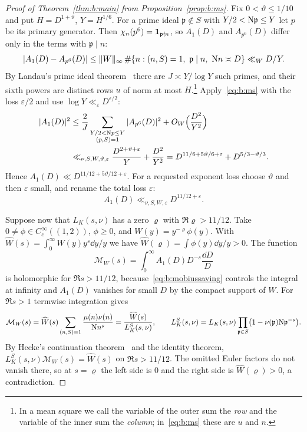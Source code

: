\begin{proof}[Proof of Theorem~\ref{thm:b:main} from Proposition~\ref{prop:b:ms}]
Fix $0<\vartheta\le1/10$ and put $H=D^{1+\vartheta}$, $Y=H^{1/6}$. For a prime ideal $\mathfrak p\notin S$ with $Y/2<\mathrm{N}\mathfrak p\le Y$ let $p$ be its primary generator. Then $\chi_n(p^6)=\mathbf{1}_{\mathfrak p\nmid n}$, so $A_1(D)$ and $A_{p^6}(D)$ differ only in the terms with $\mathfrak p\mid n$:
\[
  |A_1(D)-A_{p^6}(D)|\le\|W\|_\infty\,\#\{n:(n,S)=1,\ \mathfrak p\mid n,\ \NK n\asymp D\}\ll_WD/Y.
\]
By Landau's prime ideal theorem~\cite{Lan03} there are $J\asymp Y/\log Y$ such primes, and their sixth powers are distinct rows $u$ of norm at most $H$.\footnote{In a mean square we call the variable of the outer sum the \emph{row} and the variable of the inner sum the \emph{column}; in~\eqref{eq:b:ms} these are $u$ and $n$.} Apply~\eqref{eq:b:ms} with the loss $\varepsilon/2$ and use $\log Y\ll_\varepsilon D^{\varepsilon/2}$:
\begin{equation}\label{eq:b:primeextract}
\begin{aligned}
  |A_1(D)|^2&\le\frac2J\sum_{\substack{Y/2<\mathrm{N} p\le Y\\(p,S)=1}}|A_{p^6}(D)|^2+O_W\Bigl(\frac{D^2}{Y^2}\Bigr)\\
  &\ll_{\nu,S,W,\vartheta,\varepsilon}\frac{D^{2+\vartheta+\varepsilon}}Y+\frac{D^2}{Y^2}
  =D^{11/6+5\vartheta/6+\varepsilon}+D^{5/3-\vartheta/3}.
\end{aligned}
\end{equation}
Hence $A_1(D)\ll D^{11/12+5\vartheta/12+\varepsilon}$. For a requested exponent loss choose $\vartheta$ and then $\varepsilon$ small, and rename the total loss $\varepsilon$:
\begin{equation}\label{eq:b:mobiussaving}
  A_1(D)\ll_{\nu,S,W,\varepsilon}D^{11/12+\varepsilon}.
\end{equation}

Suppose now that $L_K(s,\nu)$ has a zero $\varrho$ with $\Re\varrho>11/12$. Take $0\ne\phi\in C_c^\infty((1,2))$, $\phi\ge0$, and $W(y)=y^{-\varrho}\phi(y)$. With $\widehat W(s)=\int_0^\infty W(y)y^s\dd y/y$ we have $\widehat W(\varrho)=\int\phi(y)\dd y/y>0$. The function
\[
  \mathcal M_W(s)=\int_0^\infty A_1(D)D^{-s}\frac{\dd D}D
\]
is holomorphic for $\Re s>11/12$, because~\eqref{eq:b:mobiussaving} controls the integral at infinity and $A_1(D)$ vanishes for small $D$ by the compact support of $W$. For $\Re s>1$ termwise integration gives
\[
  \mathcal M_W(s)=\widehat W(s)\sum_{(n,S)=1}\frac{\mu(n)\nu(n)}{\mathrm{N} n^s}=\frac{\widehat W(s)}{L_K^S(s,\nu)},\qquad
  L_K^S(s,\nu)=L_K(s,\nu)\prod_{\mathfrak p\in S}\bigl(1-\nu(\mathfrak p)\mathrm{N}\mathfrak p^{-s}\bigr).
\]
By Hecke's continuation theorem~\cite{Hec20} and the identity theorem, $L_K^S(s,\nu)\mathcal M_W(s)=\widehat W(s)$ on $\Re s>11/12$. The omitted Euler factors do not vanish there, so at $s=\varrho$ the left side is $0$ and the right side is $\widehat W(\varrho)>0$, a contradiction.


\end{proof}
